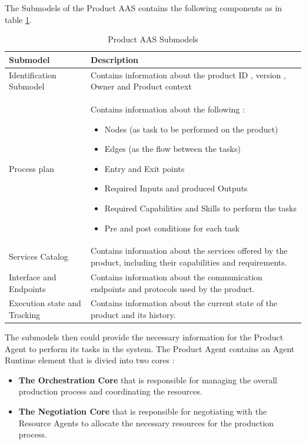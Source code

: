The Submodels of the Product AAS contains the following components as in table \ref{table:product_aas_submodels}.
\begin{table}[h]
\centering
\begin{tabularx}{\textwidth}{>{\raggedright\arraybackslash}X>{\raggedright\arraybackslash}X}
\toprule
\rowcolor[HTML]{38FFF8}
\textbf{Submodel} & \textbf{Description} \\ \midrule
Identification Submodel  & Contains information about the product ID , version , Owner and Product context\\
Process plan & Contains information about the following : 
\begin{itemize}
    \item Nodes (as task to be performed on the product)
    \item Edges (as the flow between the tasks)
    \item Entry and Exit points
    \item Required Inputs and produced Outputs
    \item Required Capabilities and Skills to perform the tasks
    \item Pre and post conditions for each task
\end{itemize} \\
Services Catalog & Contains information about the services offered by the product, including their capabilities and requirements. \\
Interface and Endpoints & Contains information about the communication endpoints and protocols used by the product. \\
Execution state and Tracking & Contains information about the current state of the product and its history. \\
\bottomrule
\end{tabularx}
\caption{Product AAS Submodels}
\label{table:product_aas_submodels}
\end{table}
\newpage
The submodels then could provide the necessary information for the Product Agent to perform its tasks in the system.
The Product Agent contains an Agent Runtime element that is divied into two cores :
\begin{itemize}
    \item \textbf{The Orchestration Core} that is responsible for managing the overall production process and coordinating the resources.
    \item \textbf{The Negotiation Core} that is responsible for negotiating with the Resource Agents to allocate the necessary resources for the production process.
\end{itemize}
